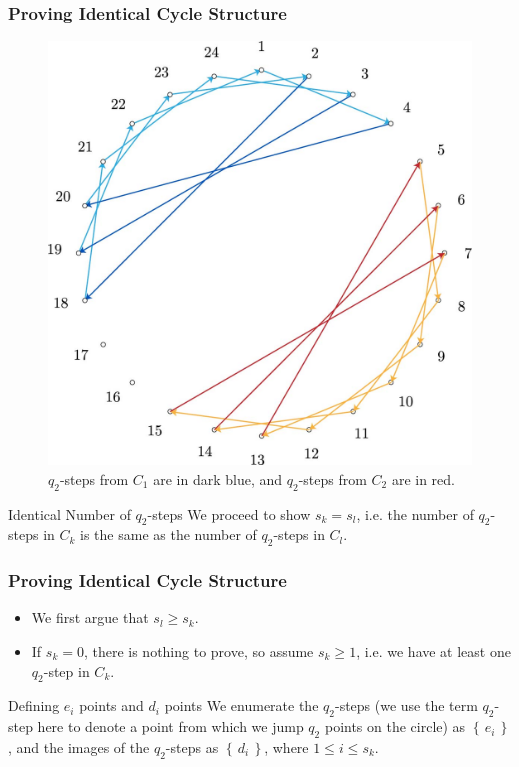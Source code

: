 \documentclass{beamer}
\theoremstyle{plain}
\theoremstyle{definition}
\theoremstyle{remark}
\renewcommand{\leq}{\leqslant}			%
\renewcommand{\geq}{\geqslant}			%
\renewcommand{\'}{\hspace{0.5mm}'}		%
\renewcommand{\Set}[1]{\left\{\,#1\,\right\}}	%
\begin{document}

\begin{frame}
\frametitle{Proving Identical Cycle Structure}

	\begin{figure}
		\includegraphics[scale=0.1]{circ_24_3_16_16_6_colored.jpg}
		\caption{$q_2$-steps from $C_1$ are in dark blue, and 
		$q_2$-steps from $C_2$ are in red. }
	\end{figure}
	\vspace{-5mm}
	\begin{block}{Identical Number of $q_2$-steps}
		We proceed to show $s_k = s_l$, i.e.
		the number of $q_2$-steps in $C_k$ is the
		same as the number of $q_2$-steps in $C_l$. 
	\end{block}
	

\end{frame}


\begin{frame}
\frametitle{Proving Identical Cycle Structure}

	\begin{itemize}
		\item We first argue that $s_l \geq s_k$. 
		\item If $s_k = 0$, there is nothing to prove, 
		so assume $s_k \geq 1$, i.e. we have at least
		one $q_2$-step in $C_k$. 
	\end{itemize}
	\begin{block}{Defining $e_i$ points and $d_i$ points}
		We enumerate the $q_2$-steps (we use the term
		$q_2$-step here to denote a point
		from which we jump $q_2$ points on the circle)
		as $\Set{e_i}$, and the images of the 
		$q_2$-steps as $\Set{d_i}$, where $1 \leq i \leq s_k$. 
	\end{block}
	

\end{frame}
\end{document}
